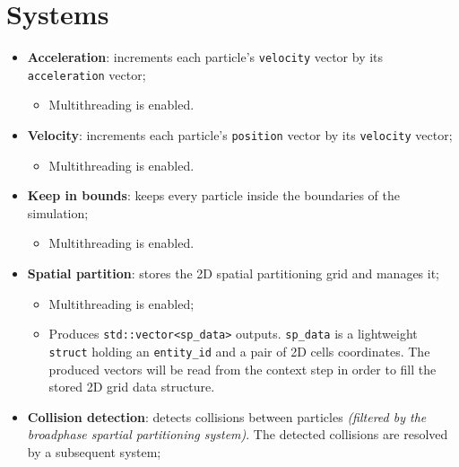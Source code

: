 \documentclass[oneside, 12pt, a4paper, openany]{book}
\providecommand{\tightlist}{%
  \setlength{\itemsep}{0pt}\setlength{\parskip}{0pt}}
\begin{document}
\section{Systems}\label{systems}

\begin{itemize}
\item
  \textbf{Acceleration}: increments each particle's
  \texttt{velocity}
  vector by its
  \texttt{acceleration}
  vector;

  \begin{itemize}
  \tightlist
  \item
    Multithreading is enabled.
  \end{itemize}
\item
  \textbf{Velocity}: increments each particle's
  \texttt{position}
  vector by its
  \texttt{velocity}
  vector;

  \begin{itemize}
  \tightlist
  \item
    Multithreading is enabled.
  \end{itemize}
\item
  \textbf{Keep in bounds}: keeps every particle inside the boundaries of
  the simulation;

  \begin{itemize}
  \tightlist
  \item
    Multithreading is enabled.
  \end{itemize}
\item
  \textbf{Spatial partition}: stores the 2D spatial partitioning grid
  and manages it;

  \begin{itemize}
  \item
    Multithreading is enabled;
  \item
    Produces
    \texttt{std::vector<sp_data>}
    outputs.
    \texttt{sp_data}
    is a lightweight
    \texttt{struct}
    holding an
    \texttt{entity_id}
    and a pair of 2D cells coordinates. The produced vectors will be
    read from the context step in order to fill the stored 2D grid data
    structure.
  \end{itemize}
\item
  \textbf{Collision detection}: detects collisions between particles
  \emph{(filtered by the broadphase spartial partitioning system)}. The
  detected collisions are resolved by a subsequent system;


\end{itemize}
\end{document}
